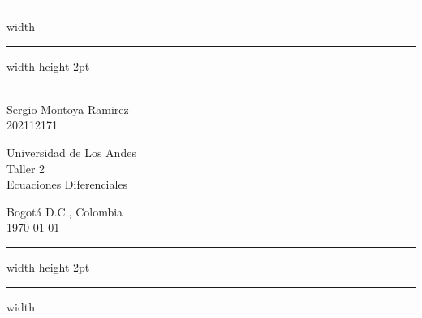 \newenvironment{notes}
  {\begin{list}
     {{\fbseries Note \arabic{counter}.}}
    {\usecounter{counter}
     \setlength{\labelsep}{1em}
     \setlength{\itemsep}{2pt}
     \setlength{\leftmargin}{2em}
     \setlength{\rightmargin}{0cm}
     \setlength{\itemindent}{1em} }}
{\end{list}}

\vspace*{-1cm}
\hrule width \hsize \kern 1mm \hrule width \hsize height 2pt
\begin{center}
   \parbox[c]{.32\textwidth}{
   \hspace{1cm}\\
   Sergio Montoya Ramirez\\
   202112171}
   \hspace*{\fill}
   \parbox[c]{.35\textwidth}{\centering
   Universidad de Los Andes\\
   Taller 2\\
   Ecuaciones Diferenciales\\
   }
   \hspace*{\fill}
   \parbox[c]{.3\textwidth}{
   \begin{flushleft}
      Bogotá D.C., Colombia\\
      \today
   \end{flushleft}}
\end{center}
\hrule width \hsize height 2pt \kern 1mm \hrule width \hsize

\bigskip

